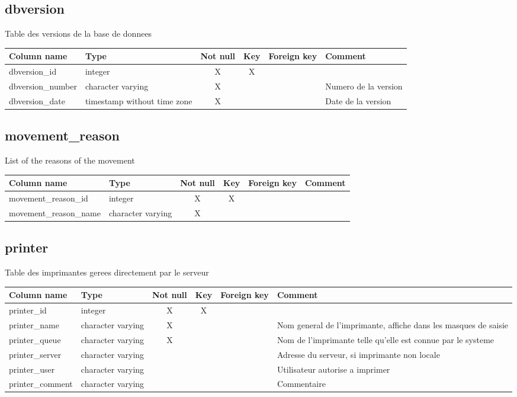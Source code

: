 \subsection{dbversion}
Table des versions de la base de donnees

\begin{tabular}{|l| p{2cm}|c|c|c| p{3cm}|}
\hline
Column name & Type & Not null & Key & Foreign key & Comment \\
\hline
dbversion\_id & integer & X & X & & \\
\hline
dbversion\_number & character varying & X & & & Numero de la version\\
\hline
dbversion\_date & timestamp without time zone & X & & & Date de la version\\
\hline
\end{tabular}
\subsection{movement\_reason}
List of the reasons of the movement

\begin{tabular}{|l| p{2cm}|c|c|c| p{3cm}|}
\hline
Column name & Type & Not null & Key & Foreign key & Comment \\
\hline
movement\_reason\_id & integer & X & X & & \\
\hline
movement\_reason\_name & character varying & X & & & \\
\hline
\end{tabular}
\subsection{printer}
Table des imprimantes gerees directement par le serveur

\begin{tabular}{|l| p{2cm}|c|c|c| p{3cm}|}
\hline
Column name & Type & Not null & Key & Foreign key & Comment \\
\hline
printer\_id & integer & X & X & & \\
\hline
printer\_name & character varying & X & & & Nom general de l'imprimante, affiche dans les masques de saisie\\
\hline
printer\_queue & character varying & X & & & Nom de l'imprimante telle qu'elle est connue par le systeme\\
\hline
printer\_server & character varying & & & & Adresse du serveur, si imprimante non locale\\
\hline
printer\_user & character varying & & & & Utilisateur autorise a imprimer \\
\hline
printer\_comment & character varying & & & & Commentaire\\
\hline
\end{tabular}
